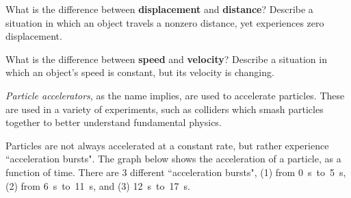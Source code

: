 \documentclass[12pt]{exam}
\begin{document}
\begin{questions}

	
	\question
	What is the difference between \textbf{displacement} and \textbf{distance}? Describe a situation in which an object travels a nonzero distance, yet experiences zero displacement.
	\vspace{1in}
	
	\question
	What is the difference between \textbf{speed} and \textbf{velocity}? Describe a situation in which an object's speed is constant, but its velocity is changing.
	\vspace{1in}

	
	\question \textit{Particle accelerators}, as the name implies, are used to accelerate particles. These are used in a variety of experiments, such as colliders which smash particles together to better understand fundamental physics.
	
	Particles are not always accelerated at a constant rate, but rather experience ``acceleration bursts". The graph below shows the acceleration of a particle, as a function of time. There are 3 different ``acceleration bursts", (1) from 0~s~to~5~s, (2) from 6~s~to~11~s, and (3) 12~s~to~17~s.
	

\end{questions}
\end{document}
